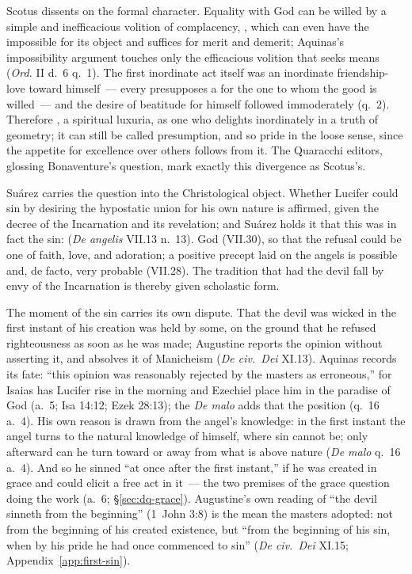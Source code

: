 Scotus dissents on the formal character. Equality with God can be willed
by a simple and inefficacious volition of complacency, , which can even have the impossible for its object and
suffices for merit and demerit; Aquinas's impossibility argument touches
only the efficacious volition that seeks means (\emph{Ord.} II d.~6
q.~1). The first inordinate act itself was an inordinate friendship-love
toward himself~--- every  presupposes a
 for the one to whom the good is willed~--- and the
desire of beatitude for himself followed immoderately (q.~2). Therefore
, a
spiritual luxuria, as one who delights inordinately in a truth of
geometry; it can still be called presumption, and so pride in the loose
sense, since the appetite for excellence over others follows from it. The
Quaracchi editors, glossing Bonaventure's question, mark exactly this
divergence as Scotus's.

Suárez carries the question into the Christological object. Whether
Lucifer could sin by desiring the hypostatic union for his own nature is
affirmed, given the decree of the Incarnation and its revelation; and
Suárez holds it  that this was in fact the sin:
 (\emph{De angelis}
VII.13 n.~13). God  (VII.30), so that the refusal could be one of faith,
love, and adoration; a positive precept laid on the angels is possible
and, de facto, very probable (VII.28). The tradition that had the devil
fall by envy of the Incarnation is thereby given scholastic form.

The moment of the sin carries its own dispute. That the devil was wicked
in the first instant of his creation was held by some, on the ground that
he refused righteousness as soon as he was made; Augustine reports the
opinion without asserting it, and absolves it of Manicheism (\emph{De
civ.\ Dei} XI.13). Aquinas records its fate: ``this opinion was
reasonably rejected by the masters as erroneous,'' for Isaias has Lucifer
rise in the morning and Ezechiel place him in the paradise of God (a.~5;
Isa 14:12; Ezek 28:13); the \emph{De malo} adds that the position
(q.~16 a.~4). His own reason is drawn from the angel's knowledge: in
the first instant the angel turns to the natural knowledge of himself,
where sin cannot be; only afterward can he turn toward or away from what
is above nature (\emph{De malo} q.~16 a.~4). And so he sinned ``at once
after the first instant,'' if he was created in grace and could elicit a
free act in it~--- the two premises of the grace question doing the work
(a.~6; \S\ref{sec:dq-grace}). Augustine's own reading of ``the devil
sinneth from the beginning'' (1~John 3:8) is the mean the masters
adopted: not from the beginning of his created existence, but ``from the
beginning of his sin, when by his pride he had once commenced to sin''
(\emph{De civ.\ Dei} XI.15; Appendix~\ref{app:first-sin}).

